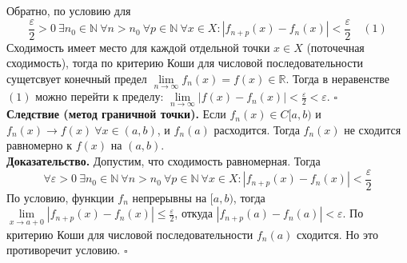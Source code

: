 Обратно, по условию для
$$\frac{\varepsilon}{2}>0~\exists n_0\in\mathbb{N}~\forall n>n_0~\forall p\in
\mathbb{N}~\forall x\in X:|f_{n+p}(x)-f_{n}(x)|<\frac{\varepsilon}{2}
\quad(1)$$
Сходимость имеет место для каждой отдельной точки $x\in X$ (поточечная 
сходимость), тогда по критерию Коши для числовой последовательности 
сущетсвует конечный предел  $\lim\limits_{n \to \infty} f_n(x)=f(x)\in
\mathbb{R}$. Тогда в неравенстве $(1)$ можно перейти к пределу:
 $\lim\limits_{n \to \infty} |f(x)-f_n(x)|<\frac{\varepsilon}{2}<
 \varepsilon$. $\square$\\
\textbf{Следствие (метод граничной точки).} Если $f_n(x)\in C[a,b)$ и 
$f_n(x)\to f(x)~\forall x\in(a,b)$, и $f_n(a)$ расходится. Тогда  $f_n(x)$
не сходится равномерно к  $f(x)$ на  $(a,b)$.\\
\textbf{Доказательство.} Допустим, что сходимость равномерная. Тогда 
$$\forall \varepsilon>0~\exists n_0\in\mathbb{N}~\forall n>n_0~\forall p\in
\mathbb{N}~\forall x\in X:|f_{n+p}(x)-f_{n}(x)|<\frac{\varepsilon}{2}$$
По условию, функции $f_n$ непрерывны на $[a,b)$, тогда 
$\lim\limits_{x \to a+0}|f_{n+p}(x)-f_n(x)|\leqslant \frac{\varepsilon}{2}$,
откуда $|f_{n+p}(a)-f_n(a)|<\varepsilon$. По критерию Коши для числовой
последовательности $f_n(a)$ сходится. Но это противоречит условию. 
$\square$
